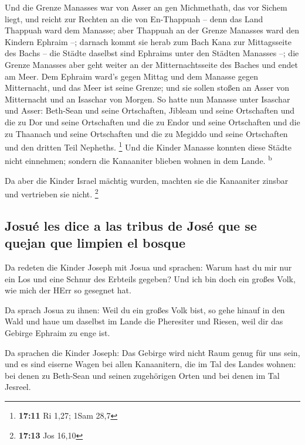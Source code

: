  Und die Grenze Manasses war von Asser an gen Michmethath,
das vor Sichem liegt, und reicht zur Rechten an die von En-Thappuah --
 denn das Land Thappuah ward dem Manasse; aber Thappuah an
der Grenze Manasses ward den Kindern Ephraim --;  darnach
kommt sie herab zum Bach Kana zur Mittagsseite des Bachs -- die Städte
daselbst sind Ephraims unter den Städten Manasses --; die Grenze
Manasses aber geht weiter an der Mitternachtsseite des Baches und endet
am Meer.  Dem Ephraim ward's gegen Mittag und dem Manasse
gegen Mitternacht, und das Meer ist seine Grenze; und sie sollen stoßen
an Asser von Mitternacht und an Isaschar von Morgen.  So
hatte nun Manasse unter Isaschar und Asser: Beth-Sean und seine
Ortschaften, Jibleam und seine Ortschaften und die zu Dor und seine
Ortschaften und die zu Endor und seine Ortschaften und die zu Thaanach
und seine Ortschaften und die zu Megiddo und seine Ortschaften und den
dritten Teil Nepheths. \footnote{\textbf{17:11} Ri 1,27; 1Sam 28,7}
 Und die Kinder Manasse konnten diese Städte nicht
einnehmen; sondern die Kanaaniter blieben wohnen in dem Lande.
\textsuperscript{b}

 Da aber die Kinder Israel mächtig wurden, machten sie
die Kanaaniter zinsbar und vertrieben sie nicht. \footnote{\textbf{17:13}
  Jos 16,10}

\hypertarget{josuuxe9-les-dice-a-las-tribus-de-josuxe9-que-se-quejan-que-limpien-el-bosque}{%
\subsection{Josué les dice a las tribus de José que se quejan que
limpien el
bosque}\label{josuuxe9-les-dice-a-las-tribus-de-josuxe9-que-se-quejan-que-limpien-el-bosque}}

 Da redeten die Kinder Joseph mit Josua und sprachen:
Warum hast du mir nur ein Los und eine Schnur des Erbteils gegeben? Und
ich bin doch ein großes Volk, wie mich der HErr so gesegnet hat.

 Da sprach Josua zu ihnen: Weil du ein großes Volk bist,
so gehe hinauf in den Wald und haue um daselbst im Lande die Pheresiter
und Riesen, weil dir das Gebirge Ephraim zu enge ist.

 Da sprachen die Kinder Joseph: Das Gebirge wird nicht
Raum genug für uns sein, und es sind eiserne Wagen bei allen
Kanaanitern, die im Tal des Landes wohnen: bei denen zu Beth-Sean und
seinen zugehörigen Orten und bei denen im Tal Jesreel.

